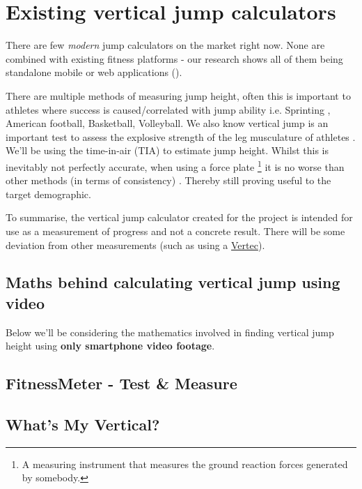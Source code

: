 \section{Existing vertical jump calculators}
There are few \textit{modern} jump calculators on the market right now. None are combined with existing fitness platforms -
our research shows all of them being standalone mobile or web applications ().
\par
There are multiple methods of measuring jump height, often this is important to athletes 
where success is caused/correlated with jump ability i.e. Sprinting \cite{jump-sprint-link}, American football, Basketball, Volleyball.
We also know vertical jump is an important test to assess the explosive strength of the leg
musculature of athletes \cite{aspects-of-strength,nsa-strength-in-athletes}.
We'll be using the time-in-air (TIA) to estimate jump height. Whilst this is inevitably not perfectly
accurate, when using a force plate \footnote{A measuring instrument that measures the ground reaction forces generated by somebody.}
it is no worse than other methods (in terms of consistency) \cite{measuring-jump-paper}.
Thereby still proving useful to the target demographic.
\par
To summarise, the vertical jump calculator created for the project is intended for use as a measurement of progress
and not a concrete result. There will be some deviation from other measurements (such as using a \href{https://www.topendsports.com/testing/products/vertical-jump/vertec.htm}{Vertec}).
\pagebreak 

\subsection{Maths behind calculating vertical jump using video}
\label{research:jump-maths}
Below we'll be considering the mathematics involved in finding vertical jump height using
\textbf{only smartphone video footage}.
\par
{}
\subsection{FitnessMeter - Test \& Measure}
\label{research:fitness-meter}
\subsection{What's My Vertical?}
\label{research:whats-my-vert}
